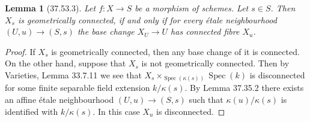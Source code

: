\documentclass[UTF8,11pt]{ctexart}
\newtheorem*{lemma}{Lemma}
\theoremstyle{definition}
\DeclareMathOperator{\Spec}{Spec}
\begin{document}
\begin{lemma}[37.53.3]
Let $f:X\to S$ be a morphism of schemes. Let $s\in S$. Then $X_s$ is geometrically connected, if and only if for every \'etale neighbourhood $(U,u)\to(S,s)$ the base change $X_U\to U$ has connected fibre $X_u$.
\end{lemma}
\begin{proof}
If $X_s$ is geometrically connected, then any base change of it is connected. On the other hand, suppose that $X_s$ is not geometrically connected. Then by Varieties, Lemma 33.7.11 we see that $X_s\times_{\Spec(\kappa(s))}\Spec(k)$ is disconnected for some finite separable field extension $k/\kappa(s)$. By Lemma 37.35.2 there exists an affine \'etale neighbourhood $(U,u)\to(S,s)$ such that $\kappa(u)/\kappa(s)$ is identified with $k/\kappa(s)$. In this case $X_u$ is disconnected.
\end{proof}
\end{document}
